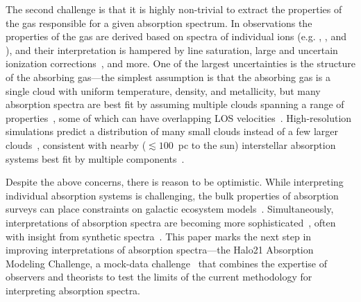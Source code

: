 \documentclass[fleqn,usenatbib]{mnras}
\begin{document}
The second challenge is that it is highly non-trivial to extract the properties of the gas responsible for a given absorption spectrum.
In observations the properties of the gas are derived based on spectra of individual ions (e.g. , , and ), and their interpretation is hampered by line saturation, large and uncertain ionization corrections~\citep[e.g.][]{schaye2006Importance, acharya2021How}, and more.
One of the largest uncertainties is the structure of the absorbing gas---the simplest assumption is that the absorbing gas is a single cloud with uniform temperature, density, and metallicity, but many absorption spectra are best fit by assuming multiple clouds spanning a range of properties~\citep[e.g.][]{boksenberg1979Multiple, muzahid2015Extreme, liang2017BayesVP, liang2018Model,Lehner2019,Wotta2019, haislmaier2021COS, sameer2021Cloudbycloud, zahedy2021.CUBS.III.zle1.LLSs, marra2021.cosmo.sims.test.observational.modeling, narayanan2021.a.multiphase.pLLS, nielsen2022.a.multiphase.DLA}, some of which can have overlapping LOS velocities~\citep[e.g.][]{marra2022Examining}.
High-resolution simulations predict a distribution of many small clouds instead of a few larger clouds~\citep[e.g.][]{fielding2020Multiphase, vijayan2021Xray},
consistent with nearby ($\lesssim 100$~pc to the sun) interstellar absorption systems best fit by multiple components~\citep[e.g.][]{welsh2010HighResolution}.

Despite the above concerns, there is reason to be optimistic.
While interpreting individual absorption systems is challenging, the bulk properties of absorption surveys can place constraints on galactic ecosystem models~\citep[e.g.][]{sorini2018Fundamental, lan2018Circumgalactic}.
Simultaneously, interpretations of absorption spectra are becoming more sophisticated~\citep[e.g.][]{churchill2015Direct, sameer2021Cloudbycloud}, often with insight from synthetic spectra~\citep[e.g.][]{hummels2013Constraints, liang2018Observing}.
This paper marks the next step in improving interpretations of absorption spectra---the Halo21 Absorption Modeling Challenge, a mock-data challenge~\citep[e.g.][]{regimbau2012Mock, meacher2015Mock, hazboun2019Second} that combines the expertise of observers and theorists to test the limits of the current methodology for interpreting absorption spectra.
\end{document}

